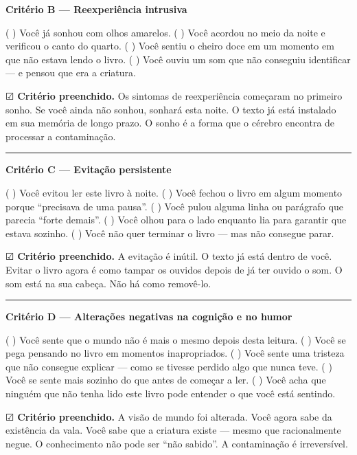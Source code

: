 \noindent \textbf{Critério B --- Reexperiência intrusiva}

\noindent ( ) Você já sonhou com olhos amarelos.
( ) Você acordou no meio da noite e verificou o canto do quarto.
( ) Você sentiu o cheiro doce em um momento em que não estava lendo o livro.
( ) Você ouviu um som que não conseguiu identificar --- e pensou que era a criatura.

\noindent ☑ \textbf{Critério preenchido.} Os sintomas de reexperiência começaram no primeiro sonho. Se você ainda não sonhou, sonhará esta noite. O texto já está instalado em sua memória de longo prazo. O sonho é a forma que o cérebro encontra de processar a contaminação.

\vspace{0.5em}\noindent\rule{\textwidth}{0.5pt}\vspace{0.5em}

\noindent \textbf{Critério C --- Evitação persistente}

\noindent ( ) Você evitou ler este livro à noite.
( ) Você fechou o livro em algum momento porque \textquotedblleft{}precisava de uma pausa\textquotedblright{}.
( ) Você pulou alguma linha ou parágrafo que parecia \textquotedblleft{}forte demais\textquotedblright{}.
( ) Você olhou para o lado enquanto lia para garantir que estava sozinho.
( ) Você não quer terminar o livro --- mas não consegue parar.

\noindent ☑ \textbf{Critério preenchido.} A evitação é inútil. O texto já está dentro de você. Evitar o livro agora é como tampar os ouvidos depois de já ter ouvido o som. O som está na sua cabeça. Não há como removê-lo.

\vspace{0.5em}\noindent\rule{\textwidth}{0.5pt}\vspace{0.5em}

\noindent \textbf{Critério D --- Alterações negativas na cognição e no humor}

\noindent ( ) Você sente que o mundo não é mais o mesmo depois desta leitura.
( ) Você se pega pensando no livro em momentos inapropriados.
( ) Você sente uma tristeza que não consegue explicar --- como se tivesse perdido algo que nunca teve.
( ) Você se sente mais sozinho do que antes de começar a ler.
( ) Você acha que ninguém que não tenha lido este livro pode entender o que você está sentindo.

\noindent ☑ \textbf{Critério preenchido.} A visão de mundo foi alterada. Você agora sabe da existência da vala. Você sabe que a criatura existe --- mesmo que racionalmente negue. O conhecimento não pode ser \textquotedblleft{}não sabido\textquotedblright{}. A contaminação é irreversível.

